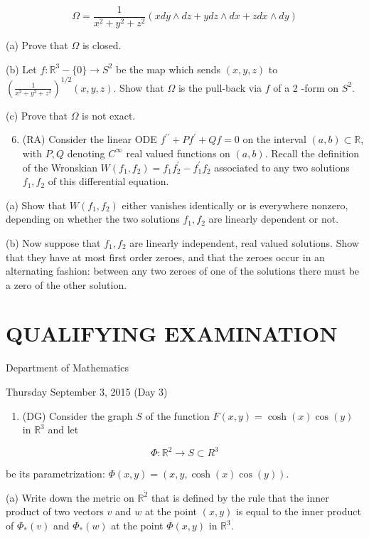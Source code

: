 \documentclass[10pt]{article}
\begin{document}
$$
\Omega=\frac{1}{x^{2}+y^{2}+z^{2}}(x d y \wedge d z+y d z \wedge d x+z d x \wedge d y)
$$

(a) Prove that $\Omega$ is closed.

(b) Let $f: \mathbb{R}^{3}-\{0\} \rightarrow S^{2}$ be the map which sends $(x, y, z)$ to $\left(\frac{1}{x^{2}+y^{2}+z^{2}}\right)^{1 / 2}(x, y, z)$. Show that $\Omega$ is the pull-back via $f$ of a 2 -form on $S^{2}$.

(c) Prove that $\Omega$ is not exact.

\begin{enumerate}
  \setcounter{enumi}{5}
  \item (RA) Consider the linear ODE $f^{\prime \prime}+P f^{\prime}+Q f=0$ on the interval $(a, b) \subset \mathbb{R}$, with $P, Q$ denoting $C^{\infty}$ real valued functions on $(a, b)$. Recall the definition of the Wronskian $W\left(f_{1}, f_{2}\right)=f_{1} f_{2}^{\prime}-f_{1}^{\prime} f_{2}$ associated to any two solutions $f_{1}, f_{2}$ of this differential equation.
\end{enumerate}

(a) Show that $W\left(f_{1}, f_{2}\right)$ either vanishes identically or is everywhere nonzero, depending on whether the two solutions $f_{1}, f_{2}$ are linearly dependent or not.

(b) Now suppose that $f_{1}, f_{2}$ are linearly independent, real valued solutions. Show that they have at most first order zeroes, and that the zeroes occur in an alternating fashion: between any two zeroes of one of the solutions there must be a zero of the other solution.

\section*{QUALIFYING EXAMINATION }
Department of Mathematics

Thursday September 3, 2015 (Day 3)

\begin{enumerate}
  \item (DG) Consider the graph $S$ of the function $F(x, y)=\cosh (x) \cos (y)$ in $\mathbb{R}^{3}$ and let
\end{enumerate}

$$
\Phi: \mathbb{R}^{2} \rightarrow S \subset R^{3}
$$

be its parametrization: $\Phi(x, y)=(x, y, \cosh (x) \cos (y))$.

(a) Write down the metric on $\mathbb{R}^{2}$ that is defined by the rule that the inner product of two vectors $v$ and $w$ at the point $(x, y)$ is equal to the inner product of $\Phi_{*}(v)$ and $\Phi_{*}(w)$ at the point $\Phi(x, y)$ in $\mathbb{R}^{3}$.
\end{document}

